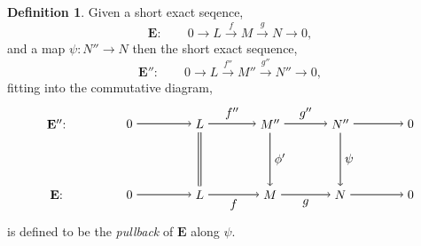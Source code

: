 \documentclass[11.5pt, twoside, a4paper, titlepage]{report}
\theoremstyle{definition}
\newtheorem{mydef}{Definition}[section]
\theoremstyle{plain}
\begin{document}
\begin{mydef} \label{pullbackdef}
Given a short exact seqence,
\begin{equation*}
\mathbf{E}: \qquad 0\xrightarrow{}L\xrightarrow{f} M \xrightarrow{g} N \xrightarrow{} 0,
\end{equation*}
and a map $\psi: N''\to N$ then the short exact sequence, 
\begin{equation*}
\mathbf{E''}: \qquad 0\xrightarrow{} L \xrightarrow{f''} M'' \xrightarrow{g''} N'' \xrightarrow{}0,
\end{equation*}
fitting into the commutative diagram,
\begin{equation*}
\begin{tikzpicture}[->,-latex, auto, main path/.style={->, semithick}, main node/.style={}]
\node	[main node]		(1) at (0,0)		{$\mathbf{E''}$: \quad };
\node	[main node]		(2) at (2,0)		{$0$};
\node	[main node]		(3) at (4,0)		{$L$};
\node [main node]		(4) at (6,0)		{$M''$};
\node [main node]		(5) at (8,0)		{$N''$};
\node	[main node]		(11) at (10,0)	{$0$};

\node	[main node]		(6) at (0,-2)		{$\mathbf{E}$: \quad};
\node	[main node]		(7) at (2,-2)		{$0$};
\node	[main node]		(8) at (4,-2)		{$L$};
\node [main node]		(9) at (6,-2)		{$M$};
\node [main node]		(10) at (8,-2)	{$N$};
\node [main node]		(13) at (10,-2)	{$0$};

\draw (2) edge [main path] node [auto] {$$} (3);
\draw (3) edge [main path] node [auto] {$f''$} (4);
\draw (4) edge [main path] node [auto] {$g''$} (5);
\draw (5) edge [main path] (11);

\draw (7) edge [main path] node [auto] {$$} (8);
\draw (8) edge [main path] node [auto, swap] {$f$} (9);
\draw (9) edge [main path] node [auto, swap] {$g$} (10);
\draw (10) edge [main path] (13);

\draw (3) edge [-, semithick, double, double distance=1.5pt] (8);
\draw (4) edge [main path] node [auto] {$\phi'$} (9);
\draw (5) edge[main path] node [auto] {$\psi$} (10);
\end{tikzpicture}
\end{equation*}
is defined to be the \emph{pullback} of $\mathbf{E}$ along $\psi$.
\end{mydef}
\end{document}
